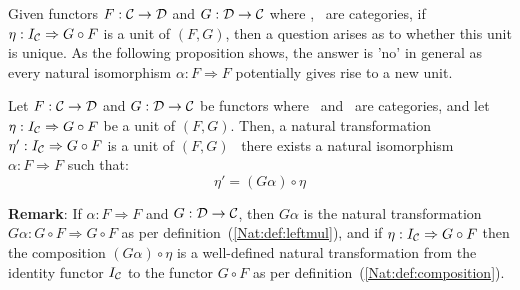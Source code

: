 Given functors $F:\mbox{$\cal C$}\to\mbox{$\cal D$}$ and $G:\mbox{$\cal D$}\to\mbox{$\cal C$}$ where \Cat, \Dat\ are 
categories, if $\eta:I_{\cal C}\Rightarrow G\circ F$ is a unit of $(F,G)$,
then a question arises as to whether this unit is unique. As the following
proposition shows, the answer is 'no' in general as every natural 
isomorphism $\alpha : F\Rightarrow F$ potentially gives rise to a 
new unit.

\begin{prop}\label{Adj:prop:unit:not:unique}
    Let $F:\mbox{$\cal C$}\to\mbox{$\cal D$}$ and $G:\mbox{$\cal D$}\to\mbox{$\cal C$}$ be functors where \Cat\ and \Dat\ 
    are categories, and let $\eta:I_{\cal C}\Rightarrow G\circ F$ be a unit
    of $(F,G)$. Then, a natural transformation $\eta':I_{\cal C}\Rightarrow 
    G\circ F$ is a unit of $(F,G)$ \ifand\ there exists a natural isomorphism 
    $\alpha:F\Rightarrow F$ such that:
        \[
            \eta'=(G\alpha)\circ\eta
        \]
\end{prop}

\noindent
{\bf Remark}: If $\alpha: F\Rightarrow F$ and $G:\mbox{$\cal D$}\to\mbox{$\cal C$}$, then $G\alpha$
is the natural transformation $G\alpha:G\circ F\Rightarrow G\circ F$ as per
definition~(\ref{Nat:def:leftmul}), and if $\eta:I_{\cal C}\Rightarrow G\circ F$
then the composition $(G\alpha)\circ\eta$ is a well-defined natural 
transformation from the identity functor $I_{\cal C}$ to the functor $G\circ F$ 
as per definition~(\ref{Nat:def:composition}).

